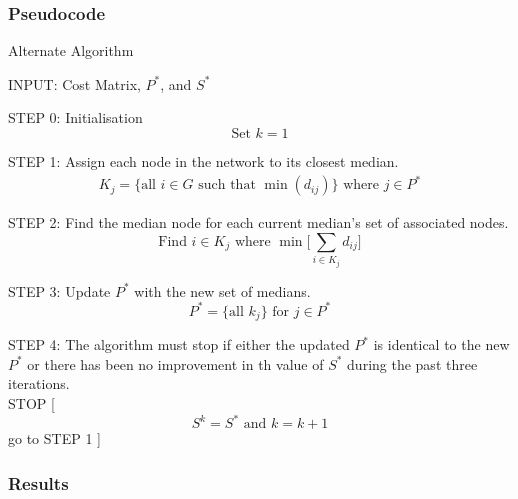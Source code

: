 \documentclass[11pt]{article}
\begin{document}
	\subsubsection{Pseudocode}
	\begin{algorithm}
		\caption{Alternate Algorithm}
		\begin{algorithmic}[0]
			\Statex 
			\Statex INPUT: Cost Matrix, $P^*$, and $S^*$
			
			\Statex 
			\Statex STEP 0: Initialisation
			\Statex 
			\begin{equation*}
			\text{Set } k = 1
			\end{equation*}
			
			\Statex 
			\Statex STEP 1: Assign each node in the network to its closest median.
			\begin{align*}
			K_j=\{\text{all } i \in G \text{ such that }\min (d_{ij})\} \text{ where } j \in P^*
			\end{align*}
			
			\Statex 
			\Statex STEP 2: Find the median node for each current median's set of associated nodes.
			\begin{equation*}
			\text{Find } i \in K_j \text{ where } \min \bigg[ \sum_{i\in K_j} d_{ij} \bigg] 
			\end{equation*}
			
			
			\Statex 
			\Statex STEP 3: Update $P^*$ with the new set of medians.
			\begin{equation*}
			P^{*} = \{\text{all } k_j  \} \text{ for } j \in P^*
			\end{equation*}
			
			\Statex 
			\Statex STEP 4: The algorithm must stop if either the updated $P^*$ is identical to the new $P^*$ or there has been no improvement in th value of $S^*$ during the past three iterations.\\
			
			\Statex STOP
			[
			\Else
			\begin{equation*}
			S^k = S^* \text{ and } k = k+1
			\end{equation*}
			\Statex go to STEP 1
			]
			\EndIf
			
		\end{algorithmic}
	\end{algorithm}


	\subsubsection{Results}
	
\end{document}
